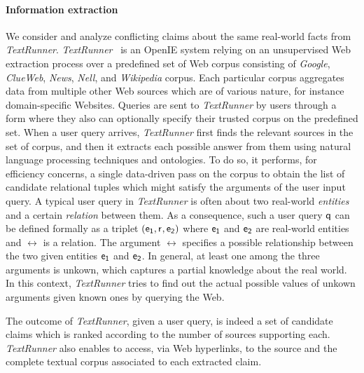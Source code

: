 \paragraph*{Information extraction} We consider and analyze 
conflicting claims about the same real-world facts from \emph{TextRunner}.
\emph{TextRunner}~\cite{Yates07, Etzioni08} is an OpenIE system relying
on an unsupervised Web extraction process over a predefined 
set of Web corpus consisting of \emph{Google}, \emph{ClueWeb}, \emph{News}, \emph{Nell}, and 
\emph{Wikipedia} corpus. Each particular corpus aggregates data from multiple 
other Web sources which are of various nature, for instance domain-specific Websites.
Queries are sent to \emph{TextRunner} by users through a form where 
they also can optionally specify their trusted corpus on the predefined set.
When a user query arrives, \emph{TextRunner} first finds the relevant
sources in the set of corpus, and then it extracts each possible answer from them
using natural language processing techniques and ontologies. 
To do so, it performs, for efficiency concerns, a single data-driven
pass on the corpus to obtain the list of candidate relational tuples 
which might satisfy the arguments of the user input query. 
A typical user query in \emph{TextRunner} is often about 
two real-world \emph{entities} and a certain \emph{relation} between them.
As a consequence, such a user query $\mathsf{q}$ can be defined formally as a triplet $(\mathsf{e_{1}}, \mathsf{r}_{}, \mathsf{e_{2}})$
where $\mathsf{e_{1}}$ and $\mathsf{e_{2}}$ are real-world entities and $\rel{}$ is a relation. The argument $\rel{}$ 
specifies a possible relationship between the two given entities $\mathsf{e_{1}}$ and $\mathsf{e_{2}}$. In general,
at least one among the three arguments is unkown, which captures a partial knowledge about the real world. 
In this context, \emph{TextRunner} tries to find out the actual possible values of unkown arguments given 
known ones by querying the Web.


The outcome of \emph{TextRunner}, given a user query, is indeed a set of candidate claims which is ranked according 
to the number of sources supporting each. \emph{TextRunner} also enables to access, via Web hyperlinks, to the source
and the complete textual corpus associated to each extracted claim.

